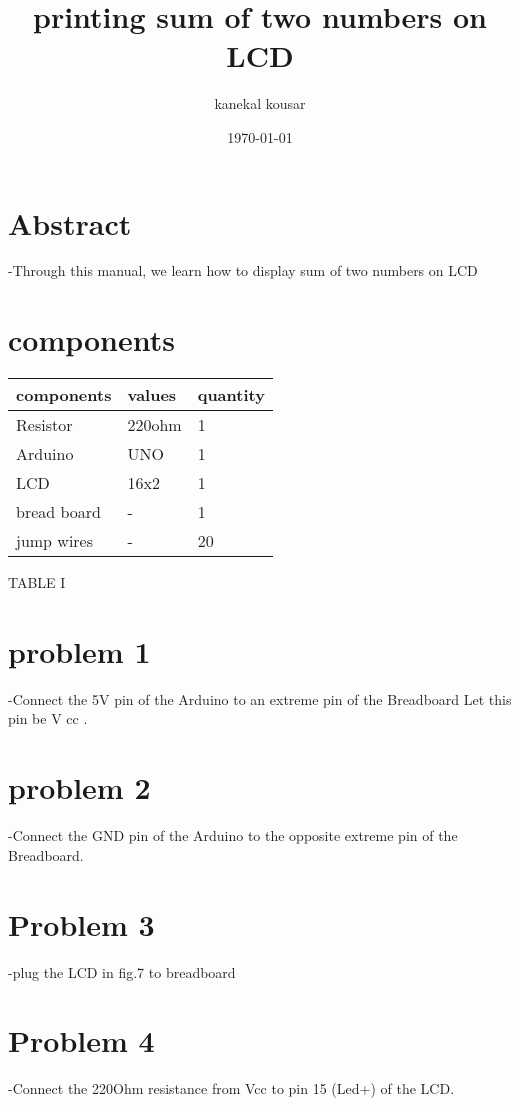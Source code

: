 \documentclass[twocolumn,13pt]{article}
\begin{document}
\title{\textbf{printing sum of two numbers on LCD}}

\author{kanekal kousar}
\date{\today}
\maketitle

 \section{Abstract}-Through this manual, we learn how to display sum of two numbers on LCD


\section{components}


\begin{tabular}{ |p{3cm}|p{1.5cm}|p{1.5cm}| }
 \hline
 \setlength{\tabcolsep}{3pt}
components & values & quantity \\
\hline
 Resistor  & 220ohm    &1\\
 Arduino &   UNO & 1\\
 LCD &16x2 & 1\\
 bread board  &-& 1\\
 jump wires&  - & 20\\
 \hline
\end{tabular}
\begin{center}
    TABLE I
\end{center}
 

\section*{problem 1}
-Connect the 5V pin of the Arduino to an extreme pin of the Breadboard
Let this pin be V cc .
\section*{problem 2}
-Connect the GND pin of the Arduino to the opposite extreme pin of the Breadboard.
\section*{Problem 3}
-plug the LCD in fig.7 to breadboard
\section*{Problem 4}
-Connect the 220Ohm resistance from Vcc to pin 15 (Led+) of the LCD.
\end{document}
